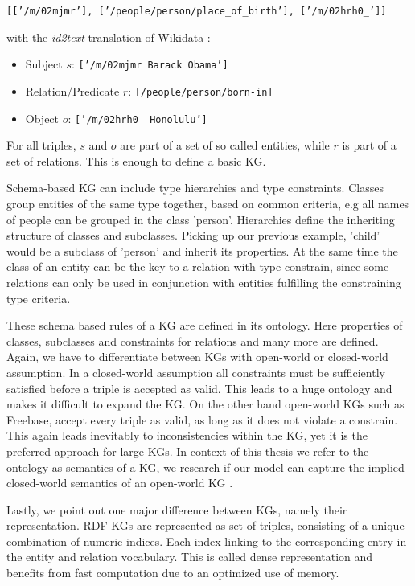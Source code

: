\begin{center}
    \texttt{[['/m/02mjmr'], ['/people/person/place\_of\_birth'], ['/m/02hrh0\_']]}
\end{center}



with the \textit{id2text} translation of Wikidata \cite{WIKIDATA}:
\begin{itemize}
    \item Subject $s$:   \texttt{['/m/02mjmr Barack Obama']}
    \item Relation/Predicate $r$:    \texttt{[/people/person/born-in]}
    \item Object $o$:     \texttt{['/m/02hrh0\_ Honolulu']}
\end{itemize}


For all triples, $s$ and $o$ are part of a set of so called entities, while $r$ is part of a set of relations. This is enough to define a basic KG.

Schema-based KG can include type hierarchies and type constraints. Classes group entities of the same type together, based on common criteria, e.g all names of people can be grouped in the class 'person'. Hierarchies define the inheriting structure of classes and subclasses. Picking up our previous example, 'child' would be a subclass of 'person' and inherit its properties. At the same time the class of an entity can be the key to a relation with type constrain, since some relations can only be used in conjunction with entities fulfilling the constraining type criteria.

These schema based rules of a KG are defined in its ontology. Here properties of classes, subclasses and constraints for relations and many more are defined. Again, we have to differentiate between KGs with open-world or closed-world assumption. In a closed-world assumption all constraints must be sufficiently satisfied before a triple is accepted as valid. This leads to a huge ontology and makes it difficult to expand the KG. On the other hand open-world KGs such as Freebase, accept every triple as valid, as long as it does not violate a constrain. This again leads inevitably to inconsistencies within the KG, yet it is the preferred approach for large KGs. In context of this thesis we refer to the ontology as semantics of a KG, we research if our model can capture the implied closed-world semantics of an open-world KG \cite{nickel_review_2016}.

Lastly, we point out one major difference between KGs, namely their representation. RDF KGs are represented as set of triples, consisting of a unique combination of numeric indices. Each index linking to the corresponding entry in the entity and relation vocabulary. This is called dense representation and benefits from fast computation due to an optimized use of memory.

